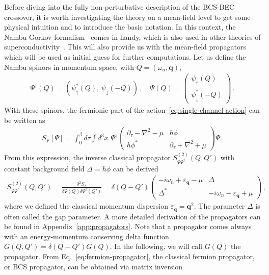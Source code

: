 Before diving into the fully non-perturbative description of the BCS-BEC crossover, it is worth investigating the theory on a mean-field level to get some physical intuition and to introduce the basic notation. In this context, the Nambu-Gorkov formalism~\cite{Boettcher2012} comes in handy, which is also used in other theories of superconductivity~\cite{Strinati2018}. This will also provide us with the mean-field propagators which will be used as initial guess for further computations. Let us define the Nambu spinors in momentum space, with $Q=(\omega_n,\bm{q})$,
%
\begin{align}
	\label{eq:nambu-spinors}
	\Psi^{\dagger}(Q) = \left(\psi_{\uparrow}^*(Q), \, \psi_{\downarrow}(-Q)\right) \,, \quad
	\Psi(Q) = \begin{pmatrix}\psi_{\uparrow}(Q) \\ \psi_{\downarrow}^*(-Q)\end{pmatrix} \,.
\end{align}
%
With these spinors, the fermionic part of the action~\eqref{eq:single-channel-action} can be written as
%
\begin{align}
	\label{eq:fermionic-action}
	S_F[\Psi] = \int_{0}^{\beta} d\tau \int d^3 x\,\, \Psi^{\dagger}
	\begin{pmatrix} \partial_{\tau}-\nabla^2-\mu  & h\phi \\
	h\phi^* & \partial_{\tau}+\nabla^2+\mu \end{pmatrix}
	\Psi \,.
\end{align}
%
From this expression, the inverse classical propagator $S^{(2)}_{\Psi\Psi^{\dagger}}(Q,Q')$
with constant background field $\Delta = h\phi$ can be derived~\cite{Diehl2010}
%
\begin{align}
	\label{eq:fermion-propagator}
	S^{(2)}_{\Psi\Psi^{\dagger}}(Q,Q') = \frac{\delta^2 S_F}{\delta\Psi(Q)\delta\Psi^{\dagger}(Q')} 
	= \delta(Q-Q')
	\begin{pmatrix} -i\omega_n+\varepsilon_{\bm{q}}-\mu & \Delta \\
	\Delta^* & -i\omega_n-\varepsilon_{\bm{q}}+\mu \end{pmatrix} \,,
\end{align}
%
where we defined the classical momentum dispersion $\varepsilon_{\bm{q}}=\bm{q}^2$. The parameter $\Delta$ is often called the gap parameter. A more detailed derivation of the propagators can be found in Appendix~\ref{app:propagators}. Note that a propagator comes always with an energy-momentum conserving delta function $G(Q,Q')=\delta(Q-Q')G(Q)$. In the following, we will call $G(Q)$ the propagator. From Eq.~\eqref{eq:fermion-propagator}, the classical fermion propagator, or BCS propagator, can be obtained via matrix inversion~\cite{VanLoon2020}
